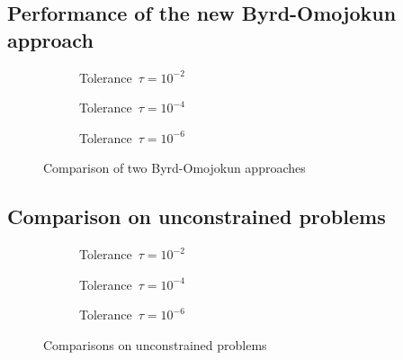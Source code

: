 \subsection{Performance of the new Byrd-Omojokun approach}
\label{subsec:perf-byrd-omojokun}

\begin{figure}[ht]
    \centering
    \begin{subfigure}[b]{0.49\textwidth}
        \centering
        \caption{Tolerance~$\tau = 10^{-2}$}
    \end{subfigure}
    \hfill
    \begin{subfigure}[b]{0.49\textwidth}
        \centering
        \caption{Tolerance~$\tau = 10^{-4}$}
    \end{subfigure}
    \begin{subfigure}[b]{0.49\textwidth}
        \centering
        \caption{Tolerance~$\tau = 10^{-6}$}
    \end{subfigure}
    \caption{Comparison of two Byrd-Omojokun approaches}
\end{figure}

\subsection{Comparison on unconstrained problems}

\begin{figure}[ht]
    \centering
    \begin{subfigure}[b]{0.49\textwidth}
        \centering
        \caption{Tolerance~$\tau = 10^{-2}$}
    \end{subfigure}
    \hfill
    \begin{subfigure}[b]{0.49\textwidth}
        \centering
        \caption{Tolerance~$\tau = 10^{-4}$}
    \end{subfigure}
    \begin{subfigure}[b]{0.49\textwidth}
        \centering
        \caption{Tolerance~$\tau = 10^{-6}$}
    \end{subfigure}
    \caption{Comparisons on unconstrained problems}
\end{figure}

